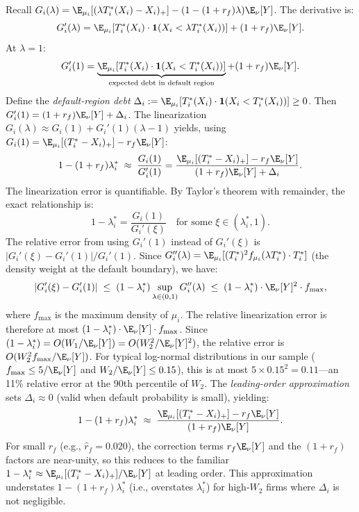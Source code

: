 Recall $G_i(\lambda) = \E_{\mu_i}[(\lambda T_i^*(X_i)-X_i)_+] - (1-(1+r_f)\lambda)\E_\nu[Y]$. The derivative is:
\[
  G_i'(\lambda) = \E_{\mu_i}[T_i^*(X_i)\cdot\mathbf{1}(X_i < \lambda T_i^*(X_i))] + (1+r_f)\E_\nu[Y].
\]
At $\lambda=1$:
\begin{equation}
  G_i'(1) = \underbrace{\E_{\mu_i}[T_i^*(X_i)\cdot\mathbf{1}(X_i < T_i^*(X_i))]}_{\text{expected debt in default region}} + (1+r_f)\E_\nu[Y].
  \label{eq:Gprime_exact}
\end{equation}
Define the \emph{default-region debt} $\Delta_i := \E_{\mu_i}[T_i^*(X_i)\cdot\mathbf{1}(X_i < T_i^*(X_i))] \geq 0$. Then $G_i'(1) = (1+r_f)\E_\nu[Y] + \Delta_i$. The linearization $G_i(\lambda) \approx G_i(1) + G_i'(1)(\lambda-1)$ yields, using $G_i(1) = \E_{\mu_i}[(T_i^*-X_i)_+] - r_f\E_\nu[Y]$:
\begin{equation}
  1 - (1+r_f)\lambda_i^* \;\approx\; \frac{G_i(1)}{G_i'(1)} = \frac{\E_{\mu_i}[(T_i^*-X_i)_+] - r_f\E_\nu[Y]}{(1+r_f)\E_\nu[Y] + \Delta_i}.
  \label{eq:lambda_approx_step1}
\end{equation}
The linearization error is quantifiable. By Taylor's theorem with remainder, the exact relationship is:
\[
  1 - \lambda_i^* = \frac{G_i(1)}{G_i'(\xi)} \quad \text{for some } \xi \in (\lambda_i^*, 1).
\]
The relative error from using $G_i'(1)$ instead of $G_i'(\xi)$ is $|G_i'(\xi) - G_i'(1)|/G_i'(1)$. Since $G_i''(\lambda) = \E_{\mu_i}[(T_i^*)^2 f_{\mu_i}(\lambda T_i^*) \cdot T_i^*]$ (the density weight at the default boundary), we have:
\[
  |G_i'(\xi) - G_i'(1)| \;\leq\; (1-\lambda_i^*)\sup_{\lambda \in (0,1)} G_i''(\lambda) \;\leq\; (1-\lambda_i^*) \cdot \E_\nu[Y]^2 \cdot f_{\max},
\]
where $f_{\max}$ is the maximum density of $\mu_i$. The relative linearization error is therefore at most $(1-\lambda_i^*) \cdot \E_\nu[Y] \cdot f_{\max}$. Since $(1-\lambda_i^*) = O(W_1/\E_\nu[Y]) = O(W_2^2/\E_\nu[Y]^2)$, the relative error is $O(W_2^2 f_{\max}/\E_\nu[Y])$. For typical log-normal distributions in our sample ($f_{\max} \leq 5/\E_\nu[Y]$ and $W_2/\E_\nu[Y] \leq 0.15$), this is at most $5 \times 0.15^2 = 0.11$---an 11\% relative error at the 90th percentile of $W_2$. The \emph{leading-order approximation} sets $\Delta_i \approx 0$ (valid when default probability is small), yielding:
\begin{equation}
  1 - (1+r_f)\lambda_i^* \;\approx\; \frac{\E_{\mu_i}[(T_i^*-X_i)_+] - r_f\E_\nu[Y]}{(1+r_f)\E_\nu[Y]}.
  \label{eq:lambda_approx_step1b}
\end{equation}
For small $r_f$ (e.g., $\hat{r}_f = 0.020$), the correction terms $r_f\E_\nu[Y]$ and the $(1+r_f)$ factors are near-unity, so this reduces to the familiar $1-\lambda_i^* \approx \E_{\mu_i}[(T_i^*-X_i)_+]/\E_\nu[Y]$ at leading order. This approximation understates $1-(1+r_f)\lambda_i^*$ (i.e., overstates $\lambda_i^*$) for high-$W_2$ firms where $\Delta_i$ is not negligible.

